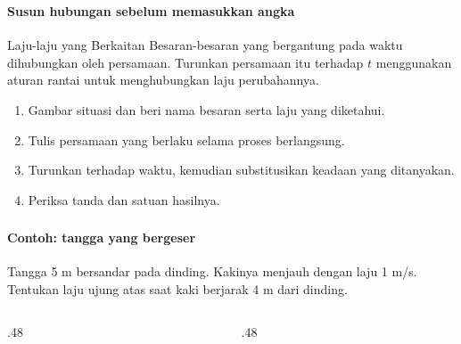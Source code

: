 \documentclass{../../kalkulus-ppt}
\begin{document}
\begin{frame}
\frametitle{\insertsection}
\framesubtitle{Susun hubungan sebelum memasukkan angka}

\begin{block}{Laju-laju yang Berkaitan}
Besaran-besaran yang bergantung pada waktu dihubungkan oleh persamaan. Turunkan persamaan itu terhadap $t$ menggunakan aturan rantai untuk menghubungkan laju perubahannya.
\end{block}
\begin{enumerate}
\item Gambar situasi dan beri nama besaran serta laju yang diketahui.
\item Tulis persamaan yang berlaku selama proses berlangsung.
\item Turunkan terhadap waktu, kemudian substitusikan keadaan yang ditanyakan.
\item Periksa tanda dan satuan hasilnya.
\end{enumerate}
\end{frame}

\begin{frame}
\frametitle{\insertsection}
\framesubtitle{Contoh: tangga yang bergeser}

\begin{contoh}
Tangga 5 m bersandar pada dinding. Kakinya menjauh dengan laju 1 m/s. Tentukan laju ujung atas saat kaki berjarak 4 m dari dinding.
\end{contoh}\begin{columns}[c]
\begin{column}{.48\textwidth}

\centering{}
\end{column}
\begin{column}{.48\textwidth}

\end{column}
\end{columns}
\end{frame}
\end{document}
